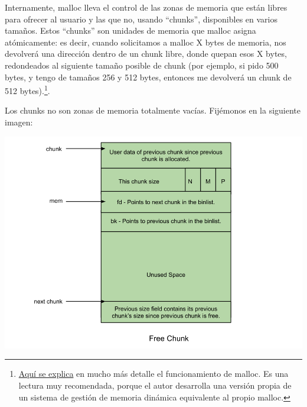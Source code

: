 \documentclass[a4paper]{article}
\begin{document}
Internamente, {\ttfamily malloc} lleva el control de las zonas de memoria que están libres para ofrecer al usuario y las que no, usando ``chunks'', disponibles en varios tamaños. Estos ``chunks'' son unidades de memoria que {\ttfamily malloc} asigna atómicamente: es decir, cuando solicitamos a {\ttfamily malloc} X bytes de memoria, nos devolverá una dirección dentro de un chunk libre, donde quepan esos X bytes, redondeados al siguiente tamaño posible de chunk (por ejemplo, si pido 500 bytes, y tengo de tamaños 256 y 512 bytes, entonces me devolverá un chunk de 512 bytes).\footnote{\href{https://danluu.com/malloc-tutorial/}{Aquí se explica} en mucho más detalle el funcionamiento de {\ttfamily malloc}. Es una lectura muy recomendada, porque el autor desarrolla una versión propia de un sistema de gestión de memoria dinámica equivalente al propio {\ttfamily malloc}.}.

Los chunks no son zonas de memoria totalmente vacías. Fijémonos en la siguiente imagen:
\begin{center}
\includegraphics[scale=0.35]{Free_chunk.png}
\end{center}
\end{document}
